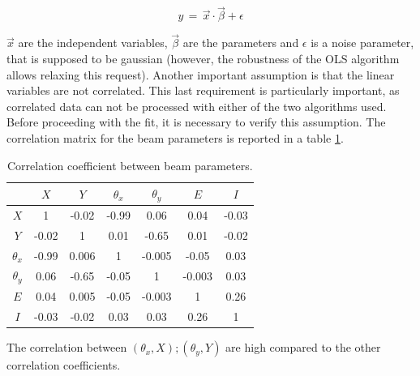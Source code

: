 \begin{equation}
 y \, = \, \vec{x} \cdot \vec{\beta} + \epsilon
\end{equation}

$\vec{x}$ are the independent variables, $\vec{\beta}$ are the parameters and $\epsilon$ is a noise parameter, that is supposed to be gaussian (however, the robustness of the OLS algorithm allows relaxing this request). Another important assumption is that the linear variables are not correlated. 
This last requirement is particularly important, as correlated data can not be processed with either of the two algorithms used. Before proceeding with the fit, it is necessary to verify this assumption. The correlation matrix for the beam parameters is reported in a table \ref{tab:CorrMatrix}.

\begin{table}[!ht]
\centering
\begin{tabular}{c|cccccc}
\hline 
             & $X$ & $Y$ & $\theta_{x}$ & $\theta_{y}$ & $E$ & $I$\\ 
\hline 
$X$            & 1 & -0.02 & -0.99 & 0.06 & 0.04  & -0.03\\ 

$Y$            & -0.02 & 1 & 0.01 & -0.65 & 0.01  & -0.02\\ 

$\theta_{x}$ & -0.99 & 0.006 & 1  & -0.005 & -0.05 & 0.03\\ 

$\theta_{y}$ & 0.06 & -0.65 & -0.05 & 1 & -0.003  & 0.03\\ 
 
$E$            & 0.04 & 0.005 & -0.05  & -0.003  & 1 & 0.26\\ 
 
$I$            & -0.03 & -0.02 & 0.03  & 0.03 & 0.26 & 1\\ 
\hline
\end{tabular}
\caption{Correlation coefficient between beam parameters.}
\label{tab:CorrMatrix} 
\end{table}

The correlation between $(\theta_{x},X);(\theta_{y},Y)$ are high compared to the other correlation coefficients. 

